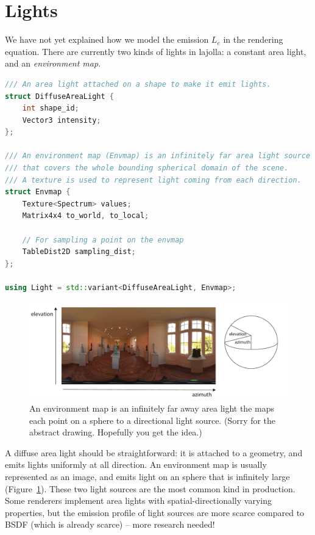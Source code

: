 \documentclass{article}
\begin{document}
\section{Lights}
We have not yet explained how we model the emission $L_e$ in the rendering equation. There are currently two kinds of lights in lajolla: a constant area light, and an \emph{environment map}.
\begin{lstlisting}[language=c++]
/// An area light attached on a shape to make it emit lights.
struct DiffuseAreaLight {
    int shape_id;
    Vector3 intensity;
};

/// An environment map (Envmap) is an infinitely far area light source
/// that covers the whole bounding spherical domain of the scene.
/// A texture is used to represent light coming from each direction.
struct Envmap {
    Texture<Spectrum> values;
    Matrix4x4 to_world, to_local;

    // For sampling a point on the envmap
    TableDist2D sampling_dist;
};

using Light = std::variant<DiffuseAreaLight, Envmap>;
\end{lstlisting}

\begin{figure}
    \centering
    \includegraphics[width=0.6\linewidth]{imgs/envmap.pdf}
    \caption{An environment map is an infinitely far away area light the maps each point on a sphere to a directional light source. (Sorry for the abstract drawing. Hopefully you get the idea.)}
    \label{fig:envmap}
\end{figure}

A diffuse area light should be straightforward: it is attached to a geometry, and emits lights uniformly at all direction. An environment map is usually represented as an image, and emits light on an sphere that is infinitely large (Figure~\ref{fig:envmap}). These two light sources are the most common kind in production. Some renderers implement area lights with spatial-directionally varying properties, but the emission profile of light sources are more scarce compared to BSDF (which is already scarce) -- more research needed!
\end{document}
